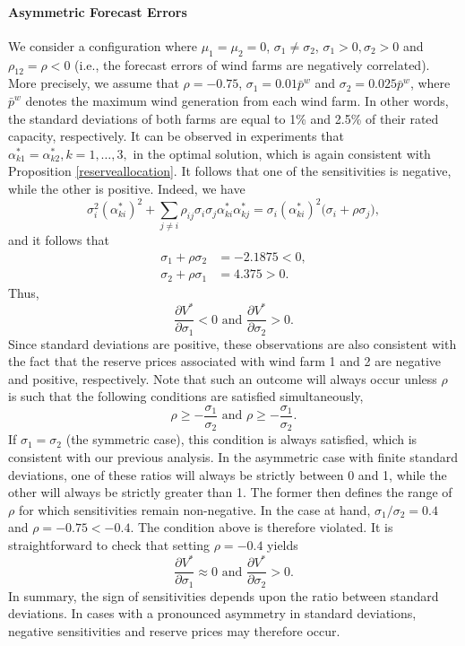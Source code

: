 \documentclass{article}
\begin{document}
\paragraph{Asymmetric Forecast Errors} We consider a configuration where $\mu_1 = \mu_2 = 0$, $\sigma_1 \ne \sigma_2$, $\sigma_1 > 0, \sigma_2 > 0$ and $\rho_{12} = \rho < 0$ (i.e., the forecast errors of wind farms are negatively correlated). More precisely, we assume that $\rho = -0.75$, $\sigma_1 = 0.01 \bar{p}^w$ and $\sigma_2 = 0.025 \bar{p}^w$, where $\bar{p}^w$ denotes the maximum wind generation from each wind farm. In other words, the standard deviations of both farms are equal to 1\% and 2.5\% of their rated capacity, respectively. It can be observed in experiments that $\alpha_{k1}^* = \alpha_{k2}^*, k = 1, \ldots, 3,$ in the optimal solution, which is again consistent with Proposition \ref{reserveallocation}. It follows that one of the sensitivities is negative, while the other is positive. Indeed, we have
\begin{equation*}
\sigma_i^2 (\alpha_{ki}^*)^2 + \sum_{j \ne i} \rho_{ij} \sigma_i \sigma_j \alpha_{ki}^* \alpha_{kj}^* = \sigma_i (\alpha_{ki}^*)^2 \big( \sigma_i + \rho \sigma_j \big),
\end{equation*}
and it follows that
\begin{align*}
\sigma_1 + \rho \sigma_2 &= -2.1875 < 0,\\
\sigma_2 + \rho \sigma_1 &= 4.375 > 0.
\end{align*}
Thus, 
\begin{equation*}
\frac{\partial V^*}{\partial \sigma_1} < 0 \mbox{ and } \frac{\partial V^*}{\partial \sigma_2} > 0.
\end{equation*}
Since standard deviations are positive, these observations are also consistent with the fact that the reserve prices associated with wind farm 1 and 2 are negative and positive, respectively. Note that such an outcome will always occur unless $\rho$ is such that the following conditions are satisfied simultaneously, 
\begin{equation*}
\rho \ge -\frac{\sigma_1}{\sigma_2} \mbox{ and } \rho \ge -\frac{\sigma_1}{\sigma_2}.
\end{equation*}
If $\sigma_1 = \sigma_2$ (the symmetric case), this condition is always satisfied, which is consistent with our previous analysis. In the asymmetric case with finite standard deviations, one of these ratios will always be strictly between 0 and 1, while the other will always be strictly greater than 1. The former then defines the range of $\rho$ for which sensitivities remain non-negative. In the case at hand, $\sigma_1/\sigma_2 = 0.4$ and $\rho = -0.75 < -0.4$. The condition above is therefore violated. It is straightforward to check that setting $\rho = -0.4$ yields
\begin{equation*}
\frac{\partial V^*}{\partial \sigma_1} \approx 0 \mbox{ and } \frac{\partial V^*}{\partial \sigma_2} > 0.
\end{equation*}
In summary, the sign of sensitivities depends upon the ratio between standard deviations. In cases with a pronounced asymmetry in standard deviations, negative sensitivities and reserve prices may therefore occur.
\end{document}
